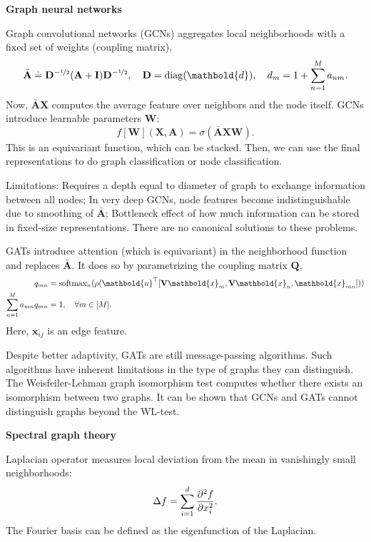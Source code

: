 \documentclass[10pt]{article}
\newenvironment{topic}[1]
{\textbf{\sffamily \footnotesize \colorbox{black}{\rlap{\textbf{\textcolor{white}{#1}}}\hspace{\linewidth}\hspace{-2\fboxsep}}}}
{}
\newenvironment{subtopic}[1]
{\vspace{0.1cm} \begin{center}\textbf{\footnotesize \sffamily #1}\end{center}}
{}
\renewcommand{\mat}[1]{\ensuremath{\mathbf{#1}}}
\renewcommand{\vec}[1]{\ensuremath{\mathbold{#1}}}
\begin{document}
\begin{multicols*}{3}
\begin{topic}{Geometric deep learning}
\begin{subtopic}{Graph neural networks}
            Graph convolutional networks (GCNs) aggregates local neighborhoods with a fixed set of weights
            (coupling matrix), \[
                \bar{\mat{A}} \doteq \mat{D}^{-\nicefrac{1}{2}} (\mat{A} + \mat{I}) \mat{D}^{-\nicefrac{1}{2}}, \quad \mat{D} = \mathrm{diag}(\vec{d}), \quad d_m = 1 + \sum_{n=1}^{M} a_{nm}.
            \]
            Now, $\bar{\mat{A}}\mat{X}$ computes the average feature over neighbors and the node itself. GCNs
            introduce learnable parameters $\mat{W}$: \[
                f[\mat{W}](\mat{X}, \mat{A}) = \sigma(\bar{\mat{A}} \mat{X} \mat{W}).
            \]
            This is an equivariant function, which can be stacked. Then, we can use the final representations
            to do graph classification or node classification.

            Limitations: Requires a depth equal to diameter of graph to exchange information between all nodes;
            In very deep GCNs, node features become indistinguishable due to smoothing of $\bar{\mat{A}}$;
            Bottleneck effect of how much information can be stored in fixed-size representations. There are no
            canonical solutions to these problems.

            GATs introduce attention (which is equivariant) in the neighborhood function and replaces
            $\bar{\mat{A}}$. It does so by parametrizing the coupling matrix $\mat{Q}$,
            \begin{align*}
                q_{mn}                       & = \mathrm{softmax}_n ( \rho(\transpose{\vec{u}} [\mat{V}\vec{x}_m, \mat{V}\vec{x}_n, \vec{x}_{mn}]) ) \\
                \sum_{n=1}^{M} a_{mn} q_{mn} & = 1, \quad \forall m \in [M].
            \end{align*}
            Here, $\vec{x}_{ij}$ is an edge feature.

            Despite better adaptivity, GATs are still message-passing algorithms. Such algorithms have inherent
            limitations in the type of graphs they can distinguish. The Weisfeiler-Lehman graph isomorphism
            test computes whether there exists an isomorphism between two graphs. It can be shown that GCNs and
            GATs cannot distinguish graphs beyond the WL-test.
        \end{subtopic}

        \begin{subtopic}{Spectral graph theory}
            Laplacian operator measures local deviation from the mean in vanishingly small neighborhoods: \[
                \Delta f = \sum_{i=1}^{d} \pdv[order=2]{f}{x_i}.
            \]
            The Fourier basis can be defined as the eigenfunction of the Laplacian.


\end{subtopic}
\end{topic}
\end{multicols*}
\end{document}
